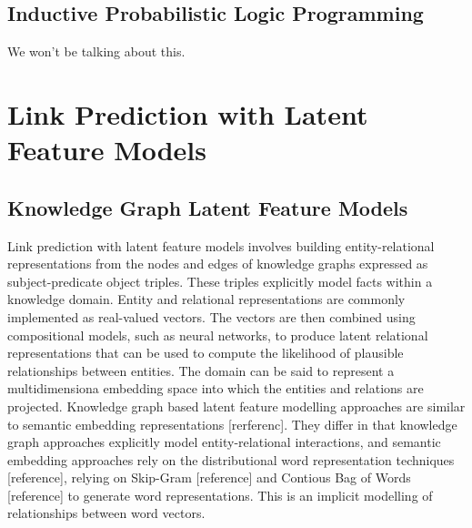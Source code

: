 \subsection{Inductive Probabilistic Logic Programming}  %
We won't be talking about this.

\section{Link Prediction with Latent Feature Models}  %
\label{section1.3}
\subsection{Knowledge Graph Latent Feature Models}
Link prediction with latent feature models involves building entity-relational representations from the nodes and edges of knowledge graphs expressed as subject-predicate object triples. These triples explicitly model facts within a knowledge domain. Entity and relational representations are commonly implemented as real-valued vectors. The vectors are then combined using compositional models, such as neural networks, to produce latent relational representations that can be used to compute the likelihood of plausible relationships between entities. The domain can be said to represent a multidimensiona embedding space into which the entities and relations are projected. Knowledge graph based latent feature modelling approaches are similar to semantic embedding representations [rerferenc]. They differ in that knowledge graph approaches explicitly model entity-relational interactions,  and semantic embedding approaches rely on the distributional word representation techniques [reference], relying on Skip-Gram [reference] and Contious Bag of Words [reference] to generate word representations. This is an implicit modelling of relationships between word vectors. \newline
